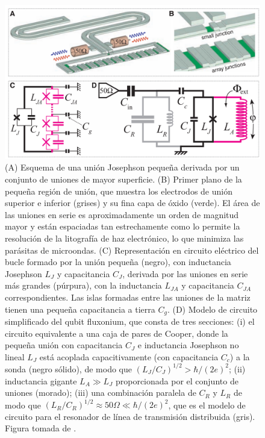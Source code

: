    \begin{figure}[h]
        \centering 
        \includegraphics[width=1\linewidth]{Figuras/Fig_scq_superinductor.png}
        \caption{(A) Esquema de una unión Josephson pequeña derivada por un conjunto de uniones de mayor superficie. (B) Primer plano de la pequeña región de unión, que muestra los electrodos de unión superior e inferior (grises) y su fina capa de óxido (verde). El área de las uniones en serie es aproximadamente un orden de magnitud mayor y están espaciadas tan estrechamente como lo permite la resolución de la litografía de haz electrónico, lo que minimiza las parásitas de microondas. (C) Representación en circuito eléctrico del bucle formado por la unión pequeña (negro), con inductancia Josephson $L_J$ y capacitancia $C_J$, derivada por las uniones en serie más grandes (púrpura), con la inductancia $L_{JA}$ y capacitancia $C_{JA}$ correspondientes. Las islas formadas entre las uniones de la matriz tienen una pequeña capacitancia a tierra $C_g$. (D) Modelo de circuito simplificado del qubit fluxonium, que consta de tres secciones: (i) el circuito equivalente a una caja de pares de Cooper, donde la pequeña unión con capacitancia $C_J$ e inductancia Josephson no lineal $L_J$ está acoplada capacitivamente (con capacitancia $C_c$) a la sonda (negro sólido), de modo que $(L_J/C_J)^{1/2} > \hbar/(2e)^2$; (ii) inductancia gigante $L_A \gg  L_J$ proporcionada por el conjunto de uniones (morado); (iii) una combinación paralela de $C_R$ y $L_R$ de modo que $(L_R/C_R)^{1/2} \approx 50 \Omega \ll  \hbar/(2e)^2$, que es el modelo de circuito para el resonador de línea de transmisión distribuida (gris). Figura tomada de  \cite{bib_sqc_superinductor_paper}.}
        \label{Fig_scq_superinductor}
    \end{figure}




